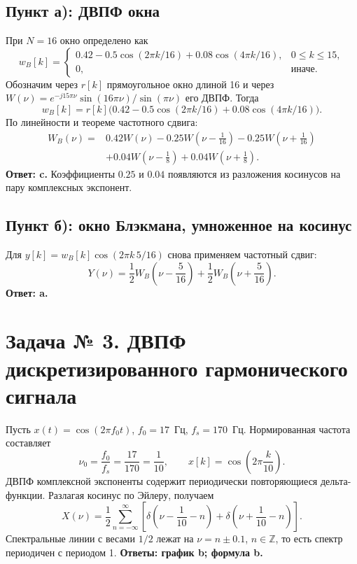 \documentclass[12pt,a4paper]{article}
\newcommand{\dd}{\delta}
\begin{document}
\subsection*{Пункт а): ДВПФ окна}
При $N=16$ окно определено как
\[
 w_B[k]=\begin{cases}
 0.42-0.5\cos(2\pi k/16)+0.08\cos(4\pi k/16),&0\le k\le15,\\
 0,&\text{иначе}.
 \end{cases}
\]
Обозначим через $r[k]$ прямоугольное окно длиной 16 и через
$W(\nu)=e^{-j15\pi\nu}\sin(16\pi\nu)/\sin(\pi\nu)$ его ДВПФ.
Тогда
\[
 w_B[k]=r[k]\bigl(0.42-0.5\cos(2\pi k/16)+0.08\cos(4\pi k/16)\bigr).
\]
По линейности и теореме частотного сдвига:
\begin{align*}
 \boxed{W_B(\nu)={}}&0.42W(\nu)
 -0.25W\left(\nu-\frac1{16}\right)
 -0.25W\left(\nu+\frac1{16}\right)\\
 &+0.04W\left(\nu-\frac18\right)
 +0.04W\left(\nu+\frac18\right).
\end{align*}
\textbf{Ответ: c.} Коэффициенты $0.25$ и $0.04$ появляются
из разложения косинусов на пару комплексных экспонент.

\subsection*{Пункт б): окно Блэкмана, умноженное на косинус}
Для $y[k]=w_B[k]\cos(2\pi k\,5/16)$ снова применяем частотный сдвиг:
\[
 \boxed{Y(\nu)=\frac12W_B\left(\nu-\frac5{16}\right)
 +\frac12W_B\left(\nu+\frac5{16}\right)}.
\]
\textbf{Ответ: a.}

\section*{Задача № 3. ДВПФ дискретизированного гармонического сигнала}
Пусть $x(t)=\cos(2\pi f_0t)$, $f_0=17$~Гц, $f_s=170$~Гц.
Нормированная частота составляет
\[
 \nu_0=\frac{f_0}{f_s}=\frac{17}{170}=\frac1{10},\qquad
 x[k]=\cos\left(2\pi\frac{k}{10}\right).
\]
ДВПФ комплексной экспоненты содержит периодически повторяющиеся
дельта-функции. Разлагая косинус по Эйлеру, получаем
\[
 \boxed{X(\nu)=\frac12\sum_{n=-\infty}^{\infty}
 \left[\dd\left(\nu-\frac1{10}-n\right)
 +\dd\left(\nu+\frac1{10}-n\right)\right]}.
\]
Спектральные линии с весами $1/2$ лежат на $\nu=n\pm0.1$,
$n\in\mathbb Z$, то есть спектр периодичен с периодом 1.
\textbf{Ответы: график b; формула b.}
\end{document}
